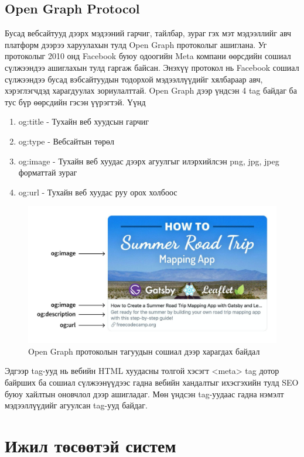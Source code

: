 \subsection{Open Graph Protocol}

Бусад вебсайтууд дээрх мэдээний гарчиг, тайлбар, зураг гэх мэт мэдээллийг авч платформ дээрээ харуулахын тулд Open Graph протоколыг ашиглана. Уг протоколыг 2010 онд Facebook буюу одоогийн Meta компани өөрсдийн сошиал сүлжээндээ ашиглахын тулд гаргаж байсан. Энэхүү протокол нь Facebook сошиал сүлжээндээ бусад вэбсайтуудын тодорхой мэдээллүүдийг хялбараар авч, хэрэглэгчдэд харагдуулах зориулалттай. Open Graph дээр үндсэн 4 tag байдаг ба тус бүр өөрсдийн гэсэн үүрэгтэй. Үүнд
\begin{enumerate}
	\item og:title - Тухайн веб хуудсын гарчиг
	\item og:type - Вебсайтын төрөл
	\item og:image - Тухайн веб хуудас дээрх агуулгыг илэрхийлсэн png, jpg, jpeg форматтай зураг
	\item og:url - Тухайн веб хуудас руу орох холбоос
\end{enumerate} 

\begin{figure}[h]
	\centering
	\includegraphics[width=15cm]{images/open-graph-card.jpeg}
	\caption{Open Graph протоколын тагуудын сошиал дээр харагдах байдал}
	\label{fig:open-graph-protocol}
\end{figure}

Эдгээр tag-ууд нь вебийн HTML хуудасны толгой хэсэгт <meta> tag дотор байрших ба сошиал сүлжээнүүдээс гадна вебийн хандалтыг ихэсгэхийн тулд SEO буюу хайлтын оновчлол дээр ашигладаг. Мөн үндсэн tag-уудаас гадна нэмэлт мэдээллүүдийг агуулсан tag-ууд байдаг.

\section{Ижил төсөөтэй систем}

